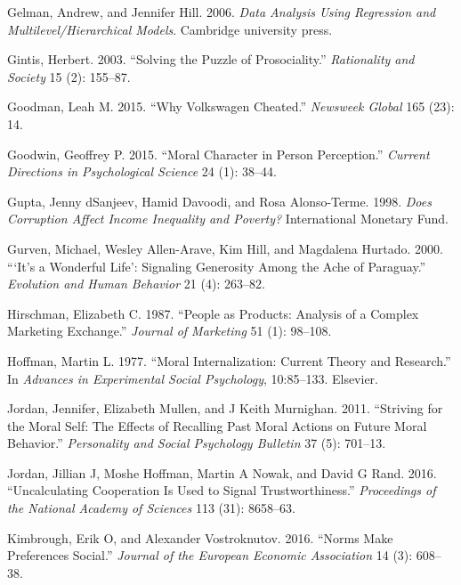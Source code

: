 \documentclass[man]{apa6}
\begin{document}
\leavevmode\hypertarget{ref-gelman2006data}{}%
Gelman, Andrew, and Jennifer Hill. 2006. \emph{Data Analysis Using
Regression and Multilevel/Hierarchical Models}. Cambridge university
press.

\leavevmode\hypertarget{ref-gintis2003solving}{}%
Gintis, Herbert. 2003. ``Solving the Puzzle of Prosociality.''
\emph{Rationality and Society} 15 (2): 155--87.

\leavevmode\hypertarget{ref-goodman2015volkswagen}{}%
Goodman, Leah M. 2015. ``Why Volkswagen Cheated.'' \emph{Newsweek
Global} 165 (23): 14.

\leavevmode\hypertarget{ref-goodwin2015moral}{}%
Goodwin, Geoffrey P. 2015. ``Moral Character in Person Perception.''
\emph{Current Directions in Psychological Science} 24 (1): 38--44.

\leavevmode\hypertarget{ref-dsanjeev1998does}{}%
Gupta, Jenny dSanjeev, Hamid Davoodi, and Rosa Alonso-Terme. 1998.
\emph{Does Corruption Affect Income Inequality and Poverty?}
International Monetary Fund.

\leavevmode\hypertarget{ref-gurven2000s}{}%
Gurven, Michael, Wesley Allen-Arave, Kim Hill, and Magdalena Hurtado.
2000. ```It's a Wonderful Life': Signaling Generosity Among the Ache of
Paraguay.'' \emph{Evolution and Human Behavior} 21 (4): 263--82.

\leavevmode\hypertarget{ref-hirschman1987people}{}%
Hirschman, Elizabeth C. 1987. ``People as Products: Analysis of a
Complex Marketing Exchange.'' \emph{Journal of Marketing} 51 (1):
98--108.

\leavevmode\hypertarget{ref-hoffman1977moral}{}%
Hoffman, Martin L. 1977. ``Moral Internalization: Current Theory and
Research.'' In \emph{Advances in Experimental Social Psychology},
10:85--133. Elsevier.

\leavevmode\hypertarget{ref-jordan2011striving}{}%
Jordan, Jennifer, Elizabeth Mullen, and J Keith Murnighan. 2011.
``Striving for the Moral Self: The Effects of Recalling Past Moral
Actions on Future Moral Behavior.'' \emph{Personality and Social
Psychology Bulletin} 37 (5): 701--13.

\leavevmode\hypertarget{ref-jordan2016uncalculating}{}%
Jordan, Jillian J, Moshe Hoffman, Martin A Nowak, and David G Rand.
2016. ``Uncalculating Cooperation Is Used to Signal Trustworthiness.''
\emph{Proceedings of the National Academy of Sciences} 113 (31):
8658--63.

\leavevmode\hypertarget{ref-kimbrough2016norms}{}%
Kimbrough, Erik O, and Alexander Vostroknutov. 2016. ``Norms Make
Preferences Social.'' \emph{Journal of the European Economic
Association} 14 (3): 608--38.
\end{document}
